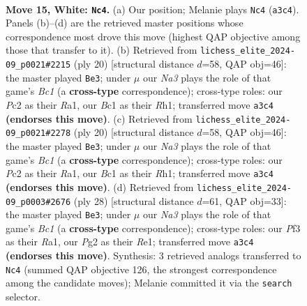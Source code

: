 \documentclass[11pt]{article}
\begin{document}
\clearpage

\begin{figure}[p]\centering
\begin{subfigure}{0.46\textwidth}\centering
\resizebox{\linewidth}{!}{%
\newchessgame
\chessboard[
  setfen={r1b1kb1r/p3n1pp/2pp4/5p2/8/N2B1P2/PPP3PP/R1B1R1K1 w kq - 4 15},
  showmover=false,
  pgfstyle=straightmove, color=movearrow, markmove={a3-c4}
]}
\caption{}
\end{subfigure}\hfill
\begin{subfigure}{0.46\textwidth}\centering
\resizebox{\linewidth}{!}{%
\newchessgame
\chessboard[
  setfen={r1b1k2r/pp1n1ppp/4p3/2b5/4B3/5N2/PPP1KPPP/R1B4R w kq - 2 11},
  showmover=false,
  pgfstyle=straightmove, color=movearrow, markmove={c1-e3}
]}
\caption{}
\end{subfigure}
\\[4pt]
\begin{subfigure}{0.46\textwidth}\centering
\resizebox{\linewidth}{!}{%
\newchessgame
\chessboard[
  setfen={r1b1k2r/pp1n1ppp/4p3/2b5/4B3/5N2/PPP1KPPP/R1B4R w kq - 2 11},
  showmover=false,
  pgfstyle=straightmove, color=movearrow, markmove={c1-e3}
]}
\caption{}
\end{subfigure}\hfill
\begin{subfigure}{0.46\textwidth}\centering
\resizebox{\linewidth}{!}{%
\newchessgame
\chessboard[
  setfen={r1br2k1/ppp2pb1/4n1p1/8/8/2N2B1P/PPP1KPP1/R1B1R3 w - - 9 15},
  showmover=false,
  pgfstyle=straightmove, color=movearrow, markmove={c1-e3}
]}
\caption{}
\end{subfigure}
\caption{\textbf{Move 15, White: \texttt{Nc4}.} (a) Our position; Melanie plays \texttt{Nc4} (\texttt{a3c4}). Panels (b)--(d) are the retrieved master positions whose correspondence most drove this move (highest QAP objective among those that transfer to it). (b) Retrieved from \texttt{lichess\_elite\_2024-09\_p0021\#2215} (ply 20) [structural distance $d$=58, QAP obj=46]: the master played \texttt{Be3}; under $\mu$ our \emph{Na3} plays the role of that game's \emph{Bc1} (a \textbf{cross-type} correspondence); cross-type roles: our \emph{P}c2 as their \emph{R}a1, our \emph{B}c1 as their \emph{R}h1; transferred move \texttt{a3c4} \textbf{(endorses this move)}. (c) Retrieved from \texttt{lichess\_elite\_2024-09\_p0021\#2278} (ply 20) [structural distance $d$=58, QAP obj=46]: the master played \texttt{Be3}; under $\mu$ our \emph{Na3} plays the role of that game's \emph{Bc1} (a \textbf{cross-type} correspondence); cross-type roles: our \emph{P}c2 as their \emph{R}a1, our \emph{B}c1 as their \emph{R}h1; transferred move \texttt{a3c4} \textbf{(endorses this move)}. (d) Retrieved from \texttt{lichess\_elite\_2024-09\_p0003\#2676} (ply 28) [structural distance $d$=61, QAP obj=33]: the master played \texttt{Be3}; under $\mu$ our \emph{Na3} plays the role of that game's \emph{Bc1} (a \textbf{cross-type} correspondence); cross-type roles: our \emph{P}f3 as their \emph{R}a1, our \emph{P}g2 as their \emph{R}e1; transferred move \texttt{a3c4} \textbf{(endorses this move)}. Synthesis: 3 retrieved analogs transferred to \texttt{Nc4} (summed QAP objective 126, the strongest correspondence among the candidate moves); Melanie committed it via the \texttt{search} selector.}

\end{figure}
\end{document}
